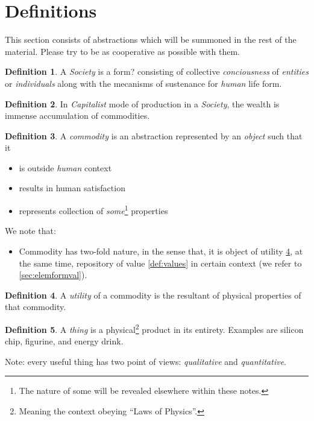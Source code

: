 \documentclass[12pt]{extarticle}
\theoremstyle{definition}
\newtheorem{definition}{Definition}[section]
\newenvironment{remark}[1][Remark]{\begin{trivlist}
\item[\hskip \labelsep {\bfseries #1}]}{\end{trivlist}}
\begin{document}
\tableofcontents

\section{Definitions}
This section consists of abstractions which will be summoned in the rest of the material.  Please try to be as cooperative as possible with them.

\begin{definition}
  A \emph{Society} is a form? consisting of collective \emph{conciousness} of \emph{entities} or \emph{individuals} along with the mecanisms of sustenance for \emph{human} life form.  
  \end{definition}

\begin{definition}
  In \emph{Capitalist} mode of production in a \emph{Society}, the wealth is immense accumulation of commodities.
\end{definition}

\begin{definition}
  \label{def:commodity}
  A \emph{commodity} is an abstraction represented by an \emph{object} such that it
  \begin{itemize}
  \item is outside \emph{human} context
  \item results in human satisfaction
  \item represents collection of \emph{some}\footnote{The nature of some will be revealed elsewhere within these notes.} properties
  \end{itemize} 
\end{definition}

\begin{remark}
  We note that:
  \begin{itemize}
  \item Commodity has two-fold nature, in the sense that, it is object of utility \ref{def:utility}, at the same time, repository of value \ref{def:values} in certain context (we refer to \ref{sec:elemformval}).
  \end{itemize}
\end{remark}

\begin{definition}
  \label{def:utility}
  A \emph{utility} of a commodity is the resultant of physical properties of that commodity.
\end{definition}

\begin{definition}
 \label{def:thing}
  A \emph{thing} is a physical\footnote{Meaning the context obeying ``Laws of Physics''.} product in its entirety.  Examples are silicon chip, figurine, and energy drink.
\end{definition}
Note: every useful thing has two point of views: \emph{qualitative} and \emph{quantitative}.
\end{document}
